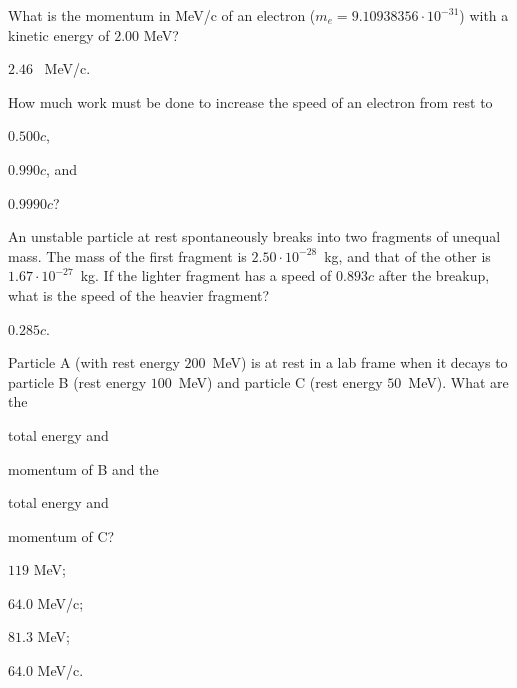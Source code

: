 \begin{problem}
	What is the momentum in MeV/c of an electron ($m_e = 9.10938356 \cdot 10^{-31}$) with a kinetic energy of $2.00$ MeV?
	\begin{solution}
		$2.46$~ MeV/c.
	\end{solution}
\end{problem}


\begin{problem}
	How much work must be done to increase the speed of an
	electron from rest to 
	\begin{enumerate*}[label=(\alph*)]
		\item $0.500c$,
		\item $0.990c$,
		and
		\item $0.9990c$?
	\end{enumerate*}
\end{problem}


\begin{problem}
	An unstable particle at rest spontaneously breaks into two fragments of unequal mass. The mass of the first fragment is $2.50 \cdot 10^{-28}$~kg, and that of the other is $1.67 \cdot 10^{-27}$~kg. If the lighter fragment has a speed of $0.893c$ after the breakup, what is the speed of the heavier fragment?
	\begin{solution}
		$0.285c$.
	\end{solution}
\end{problem}


\begin{problem}
	Particle A (with rest energy $200$~MeV) is at rest in a lab frame when it decays to particle B (rest energy $100$~MeV) and particle C (rest energy $50$~MeV). What are the
	\begin{enumerate*}[label=(\alph*)]
		\item total energy and
		\item  momentum of B and the
		\item total energy and
		\item momentum of C?
	\end{enumerate*}
	\begin{solution}
		\begin{enumerate*}[label=(\alph*)]
			\item $119$ MeV;
			\item $64.0$ MeV/c; 
			\item $81.3$ MeV; 
			\item $64.0$ MeV/c.
		\end{enumerate*}
	\end{solution}
\end{problem}

